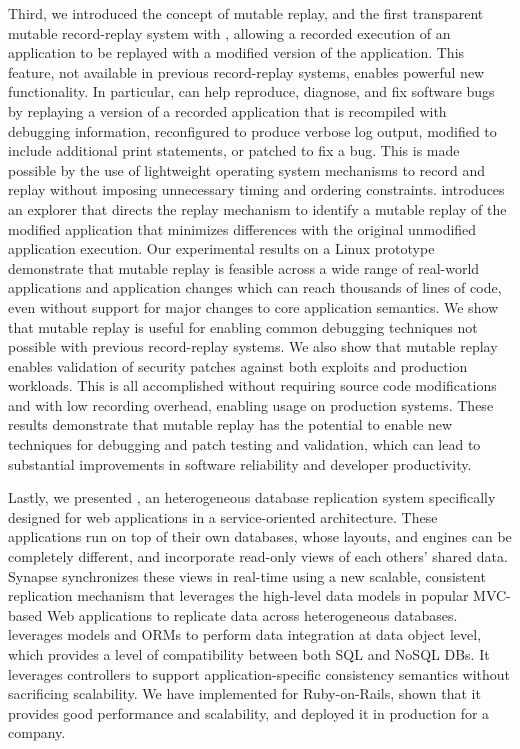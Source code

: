 Third, we introduced the concept of mutable replay, and the first transparent
mutable record-replay system with \dora, allowing a recorded execution of an
application to be replayed with a modified version of the application. This
feature, not available in previous record-replay systems, enables powerful new
functionality. In particular, \dora can help reproduce, diagnose, and fix
software bugs by replaying a version of a recorded application that is
recompiled with debugging information, reconfigured to produce verbose log
output, modified to include additional print statements, or patched to fix a
bug.  This is made possible by the use of lightweight operating system
mechanisms to record and replay without imposing unnecessary timing and ordering
constraints.  \dora introduces an explorer that directs the replay mechanism to
identify a mutable replay of the modified application that minimizes differences
with the original unmodified application execution.
Our experimental results on a Linux prototype demonstrate that mutable
replay is feasible across a wide range of real-world applications and
application changes which can reach thousands of lines of code, even
without support for major changes to core application semantics.  We
show that mutable replay is useful for enabling common debugging
techniques not possible with previous record-replay systems.  We
also show that mutable replay enables validation of security patches
against both exploits and production workloads. This is all
accomplished without requiring source code modifications and with low
recording overhead, enabling usage on production systems.  These
results demonstrate that mutable replay has the potential to enable
new techniques for debugging and patch testing and validation, which
can lead to substantial improvements in software reliability and developer
productivity.

Lastly, we presented \synapse, an heterogeneous database replication system
specifically designed for web applications in a service-oriented architecture.
These applications run on top of their own databases,
whose layouts, and engines can be completely different, and incorporate
read-only views of each others' shared data.  Synapse synchronizes these views
in real-time using a new scalable, consistent replication mechanism that
leverages the high-level data models in popular MVC-based Web applications to
replicate data across heterogeneous databases.
\synapse leverages models and ORMs to perform data integration
at data object level, which provides a level of compatibility between both SQL
and NoSQL DBs. It leverages controllers to support application-specific
consistency semantics without sacrificing scalability.  We have implemented
\synapse for Ruby-on-Rails, shown that it provides good performance and
scalability, and deployed it in production for a company.

